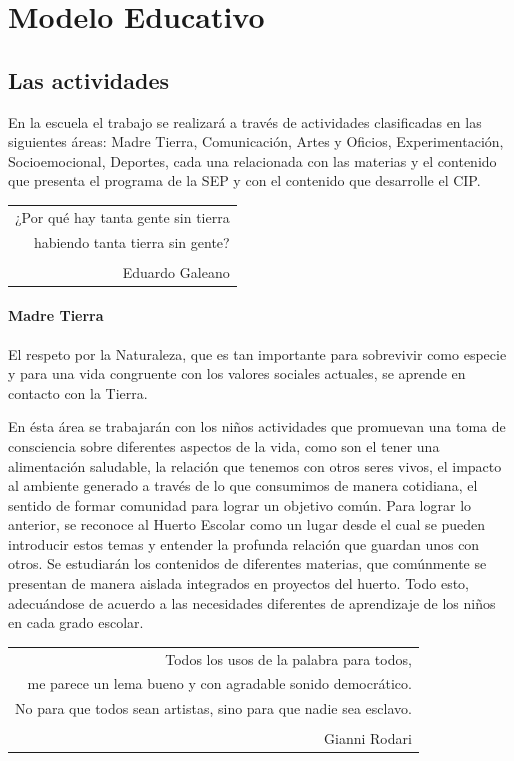 \documentclass[10pt,letterpaper,oneside]{book}
\makeatletter
\newenvironment{myepigraph}
  {\par\hfill\itshape
   \begin{tabular}{@{}r@{\hspace{2em}}}} %
  {\end{tabular}\par\medskip}
\makeatother
\begin{document}
\chapter{Modelo Educativo}
\section{Las actividades}
En la escuela el trabajo se realizará a través de actividades clasificadas en las siguientes áreas: Madre Tierra, Comunicación, Artes y Oficios, Experimentación, Socioemocional, Deportes, cada una relacionada con las materias y el contenido que presenta el programa de la SEP y con el contenido que desarrolle el CIP. 

\vspace{0.5cm}
\begin{myepigraph}¿Por qué hay tanta gente sin tierra\\
habiendo tanta tierra sin gente?\vspace{0.1cm}\\
\\
Eduardo Galeano
\end{myepigraph}
\subsubsection{Madre Tierra}
El respeto por la Naturaleza, que es tan importante para sobrevivir como especie y para una vida congruente con los valores sociales actuales, se aprende en contacto con la Tierra. 

En ésta área se trabajarán con los niños actividades que promuevan una toma de consciencia sobre diferentes aspectos de la vida, como son el tener una alimentación saludable, la relación que tenemos con otros seres vivos, el impacto al ambiente generado a través de lo que consumimos de manera cotidiana, el sentido de formar comunidad para lograr un objetivo común. Para lograr lo anterior, se reconoce al Huerto Escolar como un lugar desde el cual se pueden introducir estos temas y entender la profunda relación que guardan unos con otros. Se estudiarán los contenidos de diferentes materias,  que comúnmente se presentan de manera aislada integrados en proyectos del huerto.  Todo esto, adecuándose de acuerdo a las necesidades diferentes de aprendizaje de los niños en cada grado escolar.
 
\vspace{0.5cm}
\begin{myepigraph} Todos los usos de la palabra para todos,\\
me parece un lema bueno y con agradable sonido democrático.\\
No para que todos sean artistas, sino para que nadie sea esclavo.\\
\vspace{0.1cm}\\
Gianni Rodari
\end{myepigraph}
\end{document}
